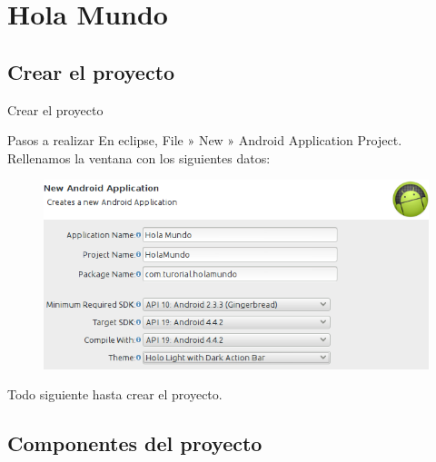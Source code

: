 \section{Hola Mundo}

\subsection{Crear el proyecto}

\begin{frame}{Crear el proyecto}
\begin{block}{Pasos a realizar}
En eclipse, File » New » Android Application Project. Rellenamos la ventana con los siguientes datos:

\begin{figure}[H]
\centering
\includegraphics[scale=.25]{./img/holamundo.png}
\end{figure}
Todo siguiente hasta crear el proyecto.
\end{block}
\end{frame}

\subsection{Componentes del proyecto}


